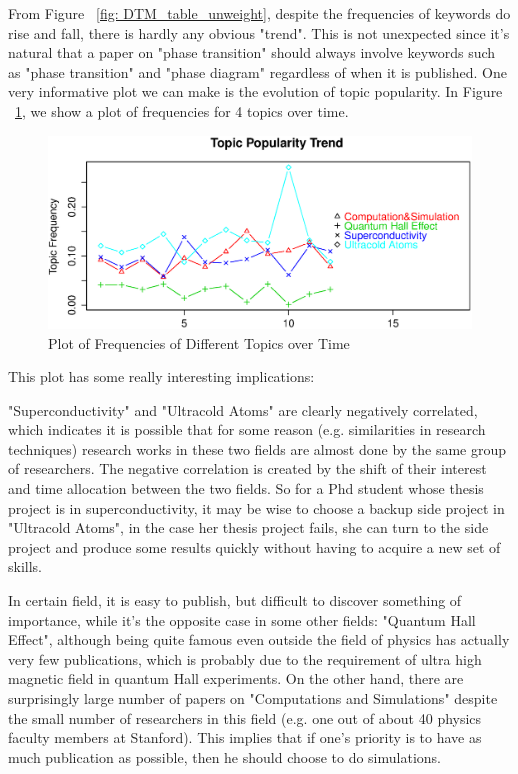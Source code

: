 \documentclass[DIV=calc, paper=letter, fontsize=10pt, twocolumn]{scrartcl}	 %
\begin{document}
From Figure ~\ref{fig: DTM_table_unweight}, despite the frequencies of keywords do rise and fall, there is hardly any obvious "trend". This is not unexpected since it's natural that a paper on "phase transition" should always involve keywords such as "phase transition" and "phase diagram" regardless of when it is published.\newline
One very informative plot we can make is the evolution of topic popularity. In Figure ~\ref{fig: TopPop_p}, we show a plot of frequencies for 4 topics over time.
\begin{figure}[!ht]
  \includegraphics[scale = 0.365]{TopPop_p.eps}
  \caption{Plot of Frequencies of Different Topics over Time}
  \label{fig: TopPop_p}
\end{figure}
This plot has some really interesting implications: 
\begin{inparaenum}
\item "Superconductivity" and "Ultracold Atoms" are clearly negatively correlated, which indicates it is possible that for some reason (e.g. similarities in research techniques) research works in these two fields are almost done by the same group of researchers. The negative correlation is created by the shift of their interest and time allocation between the two fields. So for a Phd student whose thesis project is in superconductivity, it may be wise to choose a backup side project in "Ultracold Atoms", in the case her thesis project fails, she can turn to the side project and produce some results quickly without having to acquire a new set of skills.
\item In certain field, it is easy to publish, but difficult to discover something of importance, while it's the opposite case in some other fields: "Quantum Hall Effect", although being quite famous even outside the field of physics has actually very few publications, which is probably due to the requirement of ultra high magnetic field in quantum Hall experiments. On the other hand, there are surprisingly large number of papers on "Computations and Simulations" despite the small number of researchers in this field (e.g. one out of about 40 physics faculty members at Stanford). This implies that if one's priority is to have as much publication as possible, then he should choose to do simulations.
\end{inparaenum}
\end{document}
